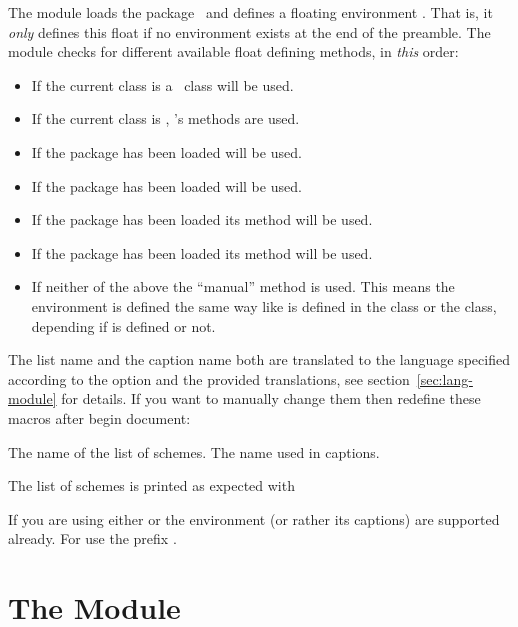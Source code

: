 \documentclass{chemmacros-manual}
\begin{document}
The  module loads the 
package~\cite{pkg:chemnum} and defines a floating environment
.  That is, it \emph{only} defines this float if no
environment  exists at the end of the preamble.  The module checks
for different available float defining methods, in \emph{this} order:
\begin{itemize}
  \item If the current class is a \KOMAScript\ class  will
    be used.
  \item If the current class is , 's methods are used.
  \item If the package  has been loaded  will
    be used.
  \item If the package  has been loaded
     will be used.
  \item {}If the package  has been loaded its
    method will be used.
  \item If the package  has been loaded its method will be used.
  \item If neither of the above the \enquote{manual} method is used.  This
    means the environment is defined the same way like  is
    defined in the  class or the  class, depending if
     is defined or not.
\end{itemize}

The list name and the caption name both are translated to the language
specified according to the  option and the provided translations,
see section~\vref{sec:lang-module} for details. If you want to manually change
them then redefine these macros after begin document:
\begin{commands}
    The name of the list of schemes.
    The name used in captions.
\end{commands}
The list of schemes is printed as expected with
\begin{commands}
\end{commands}

If you are using either  or  the
 environment (or rather its captions) are supported already.  For
 use the prefix .

\section{The  Module}\label{sec:spectroscopy-module}
\end{document}
